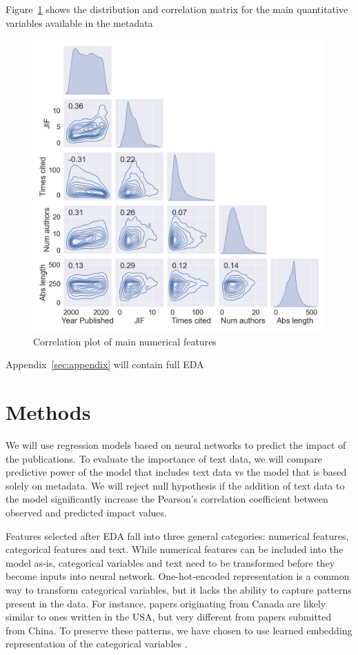 \documentclass[11pt]{article}
\begin{document}
Figure~\ref{fig:paiplot} shows the distribution and correlation matrix for the main quantitative variables available in the metadata
\begin{figure}
	\includegraphics[width= \columnwidth]{./Images/Pairplot.png}
	\caption{Correlation plot of main numerical features}
	\label{fig:paiplot}
\end{figure}
Appendix~\ref{sec:appendix} will contain full EDA

\section{Methods}
We will use regression models based on neural networks to predict the impact of the publications. To evaluate the importance of text data, we will compare predictive power of the model that includes text data vs the model that is based solely on metadata. We will reject null hypothesis if the addition of text data to the model significantly increase the Pearson's correlation coefficient between observed and predicted impact values.

Features selected after EDA fall into three general categories: numerical features, categorical features and text. While numerical features can be included into the model as-is, categorical variables and text need to be transformed before they become inputs into neural network. One-hot-encoded representation is a common way to transform categorical variables, but it lacks the ability to capture patterns present in the data. For instance, papers originating from Canada are likely similar to ones written in the USA, but very different from papers submitted from China. To preserve these patterns, we have chosen to use learned embedding representation of the categorical variables \citep{DBLP:journals/corr/GuoB16}.
\end{document}
